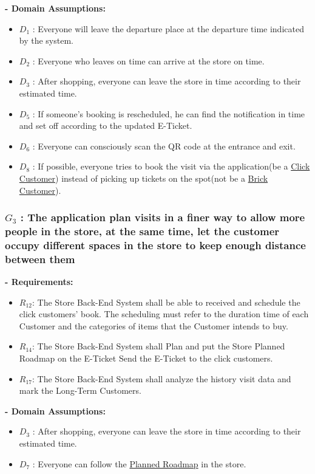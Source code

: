 \documentclass[a4paper,12pt]{report}
\begin{document}
\textbf{- Domain Assumptions:}
\begin{itemize}
	\item $D_1$ : Everyone will leave the departure place at the departure time indicated by the system.
	\item $D_2$ : Everyone who leaves on time can arrive at the store on time.
	\item $D_3$ : After shopping, everyone can leave the store in time according to their estimated time.
	\item $D_5$ : If someone’s booking is rescheduled, he can find the notification in time and set off according to the updated E-Ticket.
	\item $D_6$ : Everyone can consciously scan the QR code at the entrance and exit.
	\item $D_8$ : If possible, everyone tries to book the visit via the application(be a \hyperref[Definitions]{Click Customer}) instead of picking up tickets on the spot(not be a \hyperref[Definitions]{Brick Customer}).
\end{itemize}


\subsubsection{$G_3$ : The application plan visits in a finer way to allow more people in the store, at the same time, let the customer occupy different spaces in the store to keep enough distance between them}

\textbf{- Requirements:}
\begin{itemize}
	\item $R_{12}$: The Store Back-End System shall be able to received and schedule the click customers’ book. The scheduling must refer to the duration time of each Customer and the categories of items that the Customer intends to buy.
	\item $R_{14}$: The Store Back-End System shall Plan and put the Store Planned Roadmap on the E-Ticket Send the E-Ticket to the click customers. 	
	\item $R_{17}$: The Store Back-End System shall analyze the history visit data and mark the Long-Term Customers. 
\end{itemize}


\textbf{- Domain Assumptions:}
\begin{itemize}
	\item $D_3$ : After shopping, everyone can leave the store in time according to their estimated time.
	\item $D_7$ : Everyone can follow the \hyperref[Definitions]{Planned Roadmap} in the store.
\end{itemize}
\end{document}
